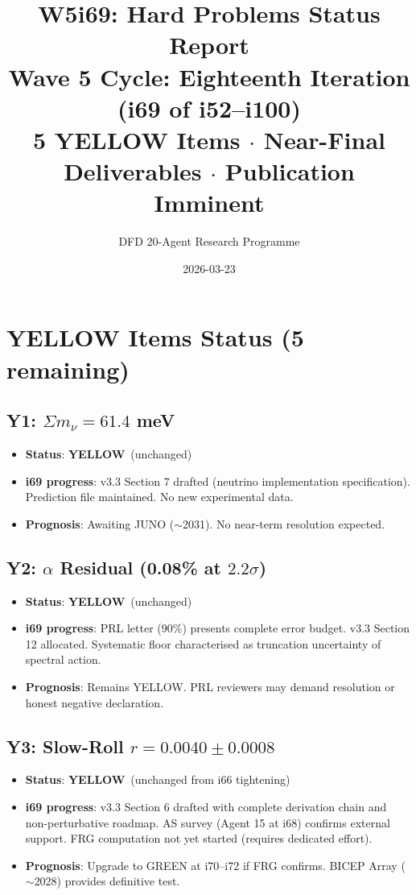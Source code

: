 \documentclass[11pt,a4paper]{article}
\title{\Large W5i69: Hard Problems Status Report\\[6pt]
\normalsize Wave 5 Cycle: Eighteenth Iteration (i69 of i52--i100)\\[6pt]
5 YELLOW Items $\cdot$ Near-Final Deliverables $\cdot$ Publication Imminent}
\author{DFD 20-Agent Research Programme}
\date{2026-03-23}
\newcommand{\YELLOW}{\textcolor{dfdyellow}{\textbf{YELLOW}}}
\begin{document}
\maketitle

\section{YELLOW Items Status (5 remaining)}

\subsection{Y1: $\Sigma m_\nu = 61.4$ meV}
\begin{itemize}[nosep]
\item \textbf{Status}: \YELLOW\ (unchanged)
\item \textbf{i69 progress}: v3.3 Section 7 drafted (neutrino implementation specification). Prediction file maintained. No new experimental data.
\item \textbf{Prognosis}: Awaiting JUNO ($\sim$2031). No near-term resolution expected.
\end{itemize}

\subsection{Y2: $\alpha$ Residual (0.08\% at $2.2\sigma$)}
\begin{itemize}[nosep]
\item \textbf{Status}: \YELLOW\ (unchanged)
\item \textbf{i69 progress}: PRL letter (90\%) presents complete error budget. v3.3 Section 12 allocated. Systematic floor characterised as truncation uncertainty of spectral action.
\item \textbf{Prognosis}: Remains YELLOW. PRL reviewers may demand resolution or honest negative declaration.
\end{itemize}

\subsection{Y3: Slow-Roll $r = 0.0040 \pm 0.0008$}
\begin{itemize}[nosep]
\item \textbf{Status}: \YELLOW\ (unchanged from i66 tightening)
\item \textbf{i69 progress}: v3.3 Section 6 drafted with complete derivation chain and non-perturbative roadmap. AS survey (Agent 15 at i68) confirms external support. FRG computation not yet started (requires dedicated effort).
\item \textbf{Prognosis}: Upgrade to GREEN at i70--i72 if FRG confirms. BICEP Array ($\sim$2028) provides definitive test.
\end{itemize}
\end{document}
